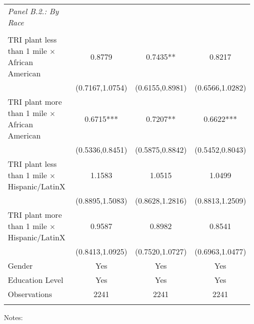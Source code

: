 \begin{table}[H]
\begin{threeparttable}
\begin{tabular}{@{\extracolsep{5pt}}lccc}
{\it Panel B.2.: By Race }\\                                          &  &  &    \\
TRI plant less than 1 mile $\times$ African American&      0.8779   &      0.7435** &      0.8217   \\
                    &(0.7167,1.0754)   &(0.6155,0.8981)   &(0.6566,1.0282)   \\
TRI plant more than 1 mile $\times$  African American&      0.6715***&      0.7207** &      0.6622***\\
                    &(0.5336,0.8451)   &(0.5875,0.8842)   &(0.5452,0.8043)   \\
TRI plant less than 1 mile $\times$ Hispanic/LatinX&      1.1583   &      1.0515   &      1.0499   \\
                    &(0.8895,1.5083)   &(0.8628,1.2816)   &(0.8813,1.2509)   \\
TRI plant more than 1 mile $\times$  Hispanic/LatinX&      0.9587   &      0.8982   &      0.8541   \\
                    &(0.8413,1.0925)   &(0.7520,1.0727)   &(0.6963,1.0477)   \\
\hline
Gender              &         Yes   &         Yes   &         Yes   \\
Education Level     &         Yes   &         Yes   &         Yes   \\
\hline Observations &        2241   &        2241   &        2241   \\
                                            \hline                                 \hline \\[-1.8ex]                                 \end{tabular}                                 \begin{tablenotes} \scriptsize                                 \item Notes:                                  \end{tablenotes}                                  \end{threeparttable}                                 \end{table}
